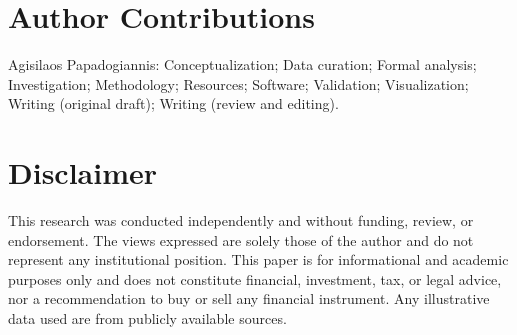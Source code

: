 \documentclass[12pt]{article}
\begin{document}
\section*{Author Contributions}
Agisilaos Papadogiannis: Conceptualization; Data curation; Formal analysis; Investigation; Methodology; Resources; Software; Validation; Visualization; Writing (original draft); Writing (review and editing).

\section*{Disclaimer}
This research was conducted independently and without funding, review, or endorsement. The views expressed are solely those of the author and do not represent any institutional position. This paper is for informational and academic purposes only and does not constitute financial, investment, tax, or legal advice, nor a recommendation to buy or sell any financial instrument. Any illustrative data used are from publicly available sources.
\end{document}
